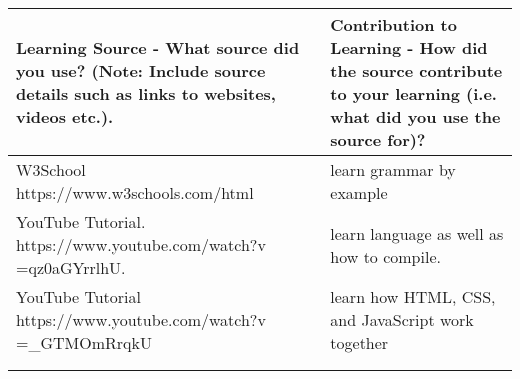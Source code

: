 \documentclass[a4paper, 11pt]{report}
\begin{document}
\begin{tabular}{|p{}|p{}|}
	\hline
	Learning Source - What source did you use? (Note: Include source details such as links to websites, videos etc.). & Contribution to Learning - How did the source contribute to your learning (i.e. what did you use the source for)?\\
	\hline
        W3School
        \newline
	https://www.w3schools.com/html & learn grammar by example\\
	\hline
        YouTube Tutorial.
        \newline
	https://www.youtube.com/watch?v
        \newline=qz0aGYrrlhU.& learn language as well as how to compile.\\
	\hline
        YouTube Tutorial
        \newline
	https://www.youtube.com/watch?v
        \newline
        =_GTMOmRrqkU & learn how HTML, CSS, and JavaScript work together\\
	\hline
	 & \\
	\hline
	 & \\
	\hline
\end{tabular}
\end{document}
